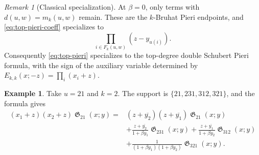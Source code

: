 \documentclass{amsart}
\theoremstyle{definition}
\newtheorem{example}[theorem]{Example}
\theoremstyle{remark}
\newtheorem{remark}[theorem]{Remark}
\DeclareMathOperator{\groth}{\mathfrak{G}}
\begin{document}
\begin{remark}[Classical specialization]
At $\beta=0$, only terms with $d(u,w)=m_k(u,w)$ remain. These are the
$k$-Bruhat Pieri endpoints, and \eqref{eq:top-pieri-coeff} specializes to
\[
\prod_{i\in F_k(u,w)}(z-y_{u(i)}).
\]
Consequently \eqref{eq:top-pieri} specializes to the top-degree double
Schubert Pieri formula, with the sign of the auxiliary variable determined by
$E_{k,k}(x;-z)=\prod_i(x_i+z)$.
\end{remark}

\begin{example}
Take $u=21$ and $k=2$. The support is
$\{21,231,312,321\}$, and the formula gives
\begin{align*}
(x_1+z)(x_2+z)\groth_{21}(x;y)
={}&(z+\overline{y_2})(z+\overline{y_1})\groth_{21}(x;y)\\
&+\frac{z+\overline{y_2}}{1+\beta y_1}\groth_{231}(x;y)
+\frac{z+\overline{y_1}}{1+\beta y_2}\groth_{312}(x;y)\\
&+\frac{1}{(1+\beta y_1)(1+\beta y_2)}\groth_{321}(x;y).
\end{align*}
\end{example}
\end{document}
